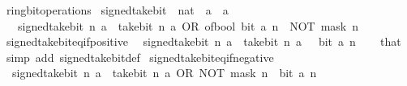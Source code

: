 \begin{isabellebody}
\isamarkupfalse%
\ ring{\isacharunderscore}{\kern0pt}bit{\isacharunderscore}{\kern0pt}operations\isanewline
{}\isanewline
\isanewline
{}\isamarkupfalse%
\ signed{\isacharunderscore}{\kern0pt}take{\isacharunderscore}{\kern0pt}bit\ {\isacharcolon}{\kern0pt}{\isacharcolon}{\kern0pt}\ {\isacartoucheopen}nat\ {\isasymRightarrow}\ {\isacharprime}{\kern0pt}a\ {\isasymRightarrow}\ {\isacharprime}{\kern0pt}a{\isacartoucheclose}\isanewline
\ \ \ {\isacartoucheopen}signed{\isacharunderscore}{\kern0pt}take{\isacharunderscore}{\kern0pt}bit\ n\ a\ {\isacharequal}{\kern0pt}\ take{\isacharunderscore}{\kern0pt}bit\ n\ a\ OR\ {\isacharparenleft}{\kern0pt}of{\isacharunderscore}{\kern0pt}bool\ {\isacharparenleft}{\kern0pt}bit\ a\ n{\isacharparenright}{\kern0pt}\ {\isacharasterisk}{\kern0pt}\ NOT\ {\isacharparenleft}{\kern0pt}mask\ n{\isacharparenright}{\kern0pt}{\isacharparenright}{\kern0pt}{\isacartoucheclose}\isanewline
\isanewline
{}\isamarkupfalse%
\ signed{\isacharunderscore}{\kern0pt}take{\isacharunderscore}{\kern0pt}bit{\isacharunderscore}{\kern0pt}eq{\isacharunderscore}{\kern0pt}if{\isacharunderscore}{\kern0pt}positive{\isacharcolon}{\kern0pt}\isanewline
\ \ {\isacartoucheopen}signed{\isacharunderscore}{\kern0pt}take{\isacharunderscore}{\kern0pt}bit\ n\ a\ {\isacharequal}{\kern0pt}\ take{\isacharunderscore}{\kern0pt}bit\ n\ a{\isacartoucheclose}\ \ {\isacartoucheopen}{\isasymnot}\ bit\ a\ n{\isacartoucheclose}\isanewline
%
\isadelimproof
\ \ %
\endisadelimproof
%
\isatagproof
{}\isamarkupfalse%
\ that\ \isamarkupfalse%
\ {\isacharparenleft}{\kern0pt}simp\ add{\isacharcolon}{\kern0pt}\ signed{\isacharunderscore}{\kern0pt}take{\isacharunderscore}{\kern0pt}bit{\isacharunderscore}{\kern0pt}def{\isacharparenright}{\kern0pt}%
\endisatagproof
{\isafoldproof}%
%
\isadelimproof
\isanewline
%
\endisadelimproof
\isanewline
{}\isamarkupfalse%
\ signed{\isacharunderscore}{\kern0pt}take{\isacharunderscore}{\kern0pt}bit{\isacharunderscore}{\kern0pt}eq{\isacharunderscore}{\kern0pt}if{\isacharunderscore}{\kern0pt}negative{\isacharcolon}{\kern0pt}\isanewline
\ \ {\isacartoucheopen}signed{\isacharunderscore}{\kern0pt}take{\isacharunderscore}{\kern0pt}bit\ n\ a\ {\isacharequal}{\kern0pt}\ take{\isacharunderscore}{\kern0pt}bit\ n\ a\ OR\ NOT\ {\isacharparenleft}{\kern0pt}mask\ n{\isacharparenright}{\kern0pt}{\isacartoucheclose}\ \ {\isacartoucheopen}bit\ a\ n{\isacartoucheclose}\isanewline
%
\isadelimproof
\ \ %
\endisadelimproof

\end{isabellebody}
